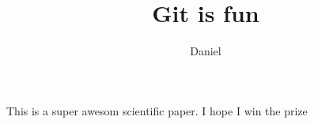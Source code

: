 \documentclass[10pt]{article}
\author{Daniel}
\title{Git is fun}
\begin{document}
		\maketitle
		
		This is a super awesom scientific paper.
		I hope I win the prize
\end{document}
